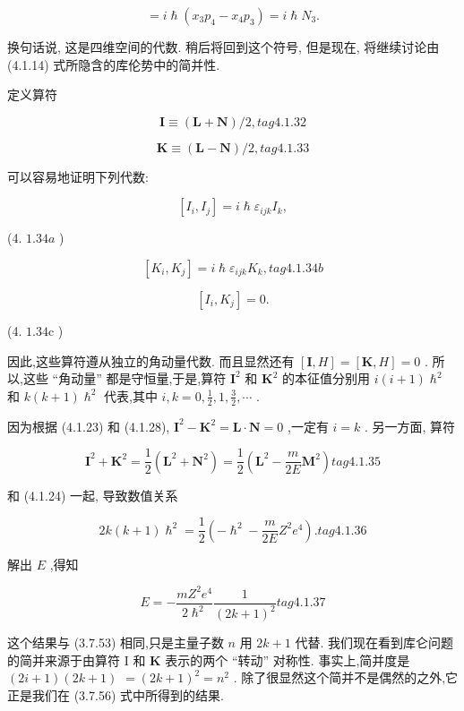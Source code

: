 $$
= i\hslash \left( {{x}_{3}{p}_{4} - {x}_{4}{p}_{3}}\right) = i\hslash {N}_{3}.
$$

换句话说, 这是四维空间的代数. 稍后将回到这个符号, 但是现在, 将继续讨论由 (4.1.14) 式所隐含的库伦势中的简并性.

定义算符

$$
\mathbf{I} \equiv \left( {\mathbf{L} + \mathbf{N}}\right) /2, tag{4. 1.32}
$$

$$
\mathbf{K} \equiv \left( {\mathbf{L} - \mathbf{N}}\right) /2, tag{4. 1.33}
$$

可以容易地证明下列代数:

$$
\left\lbrack {{I}_{i},{I}_{j}}\right\rbrack = i\hslash {\varepsilon }_{ijk}{I}_{k},
$$

(4. ${1.34a}$ )

$$
\left\lbrack {{K}_{i},{K}_{j}}\right\rbrack = i\hslash {\varepsilon }_{ijk}{K}_{k}, tag{4. 1.34b}
$$

$$
\left\lbrack {{I}_{i},{K}_{j}}\right\rbrack = 0.
$$

(4. ${1.34}\mathrm{c}$ )

因此,这些算符遵从独立的角动量代数. 而且显然还有 $\left\lbrack {\mathbf{I}, H}\right\rbrack = \left\lbrack {\mathbf{K}, H}\right\rbrack = 0$ . 所以,这些 “角动量” 都是守恒量,于是,算符 ${\mathbf{I}}^{2}$ 和 ${\mathbf{K}}^{2}$ 的本征值分别用 $i\left( {i + 1}\right) {\hslash }^{2}$ 和 $k\left( {k + 1}\right) {\hslash }^{2}$ 代表,其中 $i, k = 0,\frac{1}{2},1,\frac{3}{2},\cdots$ .

因为根据 (4.1.23) 和 (4.1.28), ${\mathbf{I}}^{2} - {\mathbf{K}}^{2} = \mathbf{L} \cdot \mathbf{N} = 0$ ,一定有 $i = k$ . 另一方面, 算符

$$
{\mathbf{I}}^{2} + {\mathbf{K}}^{2} = \frac{1}{2}\left( {{\mathbf{L}}^{2} + {\mathbf{N}}^{2}}\right) = \frac{1}{2}\left( {{\mathbf{L}}^{2} - \frac{m}{2E}{\mathbf{M}}^{2}}\right) tag{4. 1.35}
$$

和 (4.1.24) 一起, 导致数值关系

$$
{2k}\left( {k + 1}\right) {\hslash }^{2} = \frac{1}{2}\left( {-{\hslash }^{2} - \frac{m}{2E}{Z}^{2}{e}^{4}}\right) . tag{4. 1.36}
$$

解出 $E$ ,得知

$$
E = - \frac{m{Z}^{2}{e}^{4}}{2{\hslash }^{2}}\frac{1}{{\left( 2k + 1\right) }^{2}} tag{4. 1.37}
$$

这个结果与 (3.7.53) 相同,只是主量子数 $n$ 用 ${2k} + 1$ 代替. 我们现在看到库仑问题的简并来源于由算符 I 和 $\mathbf{K}$ 表示的两个 “转动” 对称性. 事实上,简并度是 $\left( {{2i} + 1}\right) \left( {{2k} + 1}\right)$ $= {\left( 2k + 1\right) }^{2} = {n}^{2}$ . 除了很显然这个简并不是偶然的之外,它正是我们在 (3.7.56) 式中所得到的结果.

